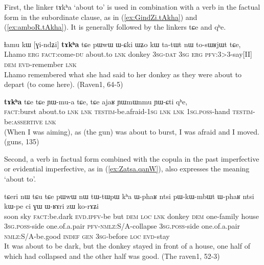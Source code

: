 \documentclass[oldfontcommands,oneside,a4paper,11pt]{article}
\newcommand{\ipa}[1]{{\phon \mbox{#1}}} %
\newcommand{\refb}[1]{(\ref{#1})}
\begin{document}
First, the linker \ipa{tɤkʰa} `about to'  is used in combination with a verb in the factual form in the subordinate clause, as in \refb{ex:GindZi.tAkha} and \refb{ex:amboR.tAkha}. It is generally followed by the linkers \ipa{tɕe} and \ipa{qʰe}. 
     \begin{exe}
\ex \label{ex:GindZi.tAkha}
\gll
\ipa{ɬamu}   	\ipa{kɯ}   	[\ipa{ɣi-ndʑi}]   	\textbf{\ipa{tɤkʰa}}   	\ipa{tɕe}   	\ipa{pɯwɯ}   	\ipa{ɯ-ɕki}   	\ipa{ɯʑo}   	\ipa{kɯ}   	\ipa{ta-tɯt}   	\ipa{nɯ}   	\ipa{to-sɯʁjɯt}   	\ipa{tɕe,}   	\\
Lhamo \textsc{erg} \textsc{fact}:come-\textsc{du} about.to \textsc{lnk} donkey \textsc{3sg-dat} \textsc{3sg} \textsc{erg} \textsc{pfv}:3>3-say[II] \textsc{dem} \textsc{evd}-remember \textsc{lnk} \\
\glt  Lhamo remembered what she had said to her donkey as they were about to depart (to come here). (Raven1, 64-5)
\end{exe}

     \begin{exe}
\ex \label{ex:amboR.tAkha}
\gll
[\ipa{amboʁ}]   	\textbf{\ipa{tɤkʰa}}   	\ipa{tɕe}   	\ipa{tɕe}   	\ipa{ɲɯ-mu-a}   	\ipa{tɕe,}   	\ipa{tɕe}   	\ipa{ajaʁ}   	\ipa{ɲɯmɯnmu}   	\ipa{ɲɯ-ɕti}   	\ipa{qʰe,}   \\
\textsc{fact}:burst  about.to \textsc{lnk}  \textsc{lnk} \textsc{testim}-be.afraid-\textsc{1sg}  \textsc{lnk}  \textsc{lnk} \textsc{1sg.poss}-hand \textsc{testim}-be:\textsc{assertive} \textsc{lnk} \\
\glt  (When I was aiming), as (the gun) was about to burst, I was afraid and I moved. (guns, 135)
\end{exe}




 
Second,  a verb in factual form combined with the copula in the past imperfective or evidential imperfective, as in \refb{ex:Zatsa.qanW}, also expresses the meaning `about to'.

     \begin{exe}
\ex \label{ex:Zatsa.qanW}
\gll
[\ipa{ʑatsa}  	\ipa{tɯmɯ}  	\ipa{qanɯ}]  	\ipa{\textbf{pjɤ-ŋu},}  	\ipa{tɕeri}  	\ipa{nɯ} \ipa{tɕu}  	\ipa{tɕe}  	\ipa{pɯwɯ}  	\ipa{nɯ}  	\ipa{tɯ-tɯpɯ}  	\ipa{kʰa}  	\ipa{ɯ-phaʁ}  	\ipa{ntsi}  	\ipa{pɯ-kɯ-mbɯt}  	\ipa{ɯ-phaʁ}  	\ipa{ntsi}  	\ipa{kɯ-pe}  	\ipa{ci}  	\ipa{ɣɯ}   	\ipa{ɯ-ʁɤri}  	\ipa{zɯ}  	\ipa{ko-rɤʑi}  \\
soon sky \textsc{fact}:be.dark \textsc{evd.ipfv}-be but \textsc{dem} \textsc{loc} \textsc{lnk} donkey \textsc{dem} one-family house \textsc{3sg.poss}-side one.of.a.pair \textsc{pfv-nmlz}:S/A-collapse  \textsc{3sg.poss}-side one.of.a.pair \textsc{nmlz}:S/A-be.good \textsc{indef}   \textsc{gen} \textsc{3sg}-before \textsc{loc} \textsc{evd}-stay \\
\glt It was about to be dark, but the donkey stayed in front of a house, one half of which had collapsed and the other half was good. (The raven1, 52-3)
 \end{exe}
\end{document}
